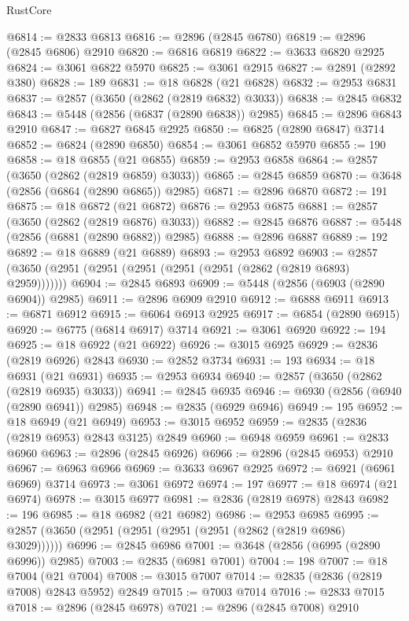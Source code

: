 \begin{lexlean}{RustCore}
\begin{coremodule}
@6814 := @2833 @6813
@6816 := @2896 (@2845 @6780)
@6819 := @2896 (@2845 @6806) @2910
@6820 := @6816 @6819
@6822 := @3633 @6820 @2925
@6824 := @3061 @6822 @5970
@6825 := @3061 @2915
@6827 := @2891 (@2892 @380)
@6828 := 189
@6831 := @18 @6828 (@21 @6828)
@6832 := @2953 @6831
@6837 := @2857 (@3650 (@2862 (@2819 @6832) @3033))
@6838 := @2845 @6832
@6843 := @5448 (@2856 (@6837 (@2890 @6838)) @2985)
@6845 := @2896 @6843 @2910
@6847 := @6827 @6845 @2925
@6850 := @6825 (@2890 @6847) @3714
@6852 := @6824 (@2890 @6850)
@6854 := @3061 @6852 @5970
@6855 := 190
@6858 := @18 @6855 (@21 @6855)
@6859 := @2953 @6858
@6864 := @2857 (@3650 (@2862 (@2819 @6859) @3033))
@6865 := @2845 @6859
@6870 := @3648 (@2856 (@6864 (@2890 @6865)) @2985)
@6871 := @2896 @6870
@6872 := 191
@6875 := @18 @6872 (@21 @6872)
@6876 := @2953 @6875
@6881 := @2857 (@3650 (@2862 (@2819 @6876) @3033))
@6882 := @2845 @6876
@6887 := @5448 (@2856 (@6881 (@2890 @6882)) @2985)
@6888 := @2896 @6887
@6889 := 192
@6892 := @18 @6889 (@21 @6889)
@6893 := @2953 @6892
@6903 := @2857 (@3650 (@2951 (@2951 (@2951 (@2951 (@2951 (@2862 (@2819 @6893) @2959)))))))
@6904 := @2845 @6893
@6909 := @5448 (@2856 (@6903 (@2890 @6904)) @2985)
@6911 := @2896 @6909 @2910
@6912 := @6888 @6911
@6913 := @6871 @6912
@6915 := @6064 @6913 @2925
@6917 := @6854 (@2890 @6915)
@6920 := @6775 (@6814 @6917) @3714
@6921 := @3061 @6920
@6922 := 194
@6925 := @18 @6922 (@21 @6922)
@6926 := @3015 @6925
@6929 := @2836 (@2819 @6926) @2843
@6930 := @2852 @3734
@6931 := 193
@6934 := @18 @6931 (@21 @6931)
@6935 := @2953 @6934
@6940 := @2857 (@3650 (@2862 (@2819 @6935) @3033))
@6941 := @2845 @6935
@6946 := @6930 (@2856 (@6940 (@2890 @6941)) @2985)
@6948 := @2835 (@6929 @6946)
@6949 := 195
@6952 := @18 @6949 (@21 @6949)
@6953 := @3015 @6952
@6959 := @2835 (@2836 (@2819 @6953) @2843 @3125) @2849
@6960 := @6948 @6959
@6961 := @2833 @6960
@6963 := @2896 (@2845 @6926)
@6966 := @2896 (@2845 @6953) @2910
@6967 := @6963 @6966
@6969 := @3633 @6967 @2925
@6972 := @6921 (@6961 @6969) @3714
@6973 := @3061 @6972
@6974 := 197
@6977 := @18 @6974 (@21 @6974)
@6978 := @3015 @6977
@6981 := @2836 (@2819 @6978) @2843
@6982 := 196
@6985 := @18 @6982 (@21 @6982)
@6986 := @2953 @6985
@6995 := @2857 (@3650 (@2951 (@2951 (@2951 (@2951 (@2862 (@2819 @6986) @3029))))))
@6996 := @2845 @6986
@7001 := @3648 (@2856 (@6995 (@2890 @6996)) @2985)
@7003 := @2835 (@6981 @7001)
@7004 := 198
@7007 := @18 @7004 (@21 @7004)
@7008 := @3015 @7007
@7014 := @2835 (@2836 (@2819 @7008) @2843 @5952) @2849
@7015 := @7003 @7014
@7016 := @2833 @7015
@7018 := @2896 (@2845 @6978)
@7021 := @2896 (@2845 @7008) @2910

\end{coremodule}
\end{lexlean}
